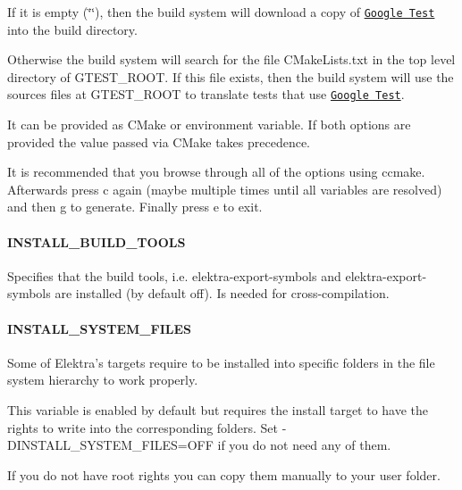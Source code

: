 \begin{DoxyItemize}
\item If it is empty ({\ttfamily \char`\"{}\char`\"{}}), then the build system will download a copy of \href{https://github.com/google/googletest}{\tt Google Test} into the build directory.
\item Otherwise the build system will search for the file {\ttfamily C\+Make\+Lists.\+txt} in the top level directory of {\ttfamily G\+T\+E\+S\+T\+\_\+\+R\+O\+OT}. If this file exists, then the build system will use the sources files at {\ttfamily G\+T\+E\+S\+T\+\_\+\+R\+O\+OT} to translate tests that use \href{https://github.com/google/googletest}{\tt Google Test}.
\end{DoxyItemize}

It can be provided as C\+Make or environment variable. If both options are provided the value passed via C\+Make takes precedence.

It is recommended that you browse through all of the options using {\ttfamily ccmake}. Afterwards press {\ttfamily c} again (maybe multiple times until all variables are resolved) and then {\ttfamily g} to generate. Finally press {\ttfamily e} to exit.

\paragraph*{{\ttfamily I\+N\+S\+T\+A\+L\+L\+\_\+\+B\+U\+I\+L\+D\+\_\+\+T\+O\+O\+LS}}

Specifies that the build tools, i.\+e. {\ttfamily elektra-\/export-\/symbols} and {\ttfamily elektra-\/export-\/symbols} are installed (by default off). Is needed for cross-\/compilation.

\paragraph*{{\ttfamily I\+N\+S\+T\+A\+L\+L\+\_\+\+S\+Y\+S\+T\+E\+M\+\_\+\+F\+I\+L\+ES}}

Some of Elektra’s targets require to be installed into specific folders in the file system hierarchy to work properly.

This variable is enabled by default but requires the install target to have the rights to write into the corresponding folders. Set {\ttfamily -\/\+D\+I\+N\+S\+T\+A\+L\+L\+\_\+\+S\+Y\+S\+T\+E\+M\+\_\+\+F\+I\+L\+ES=O\+FF} if you do not need any of them.

If you do not have root rights you can copy them manually to your user folder.

